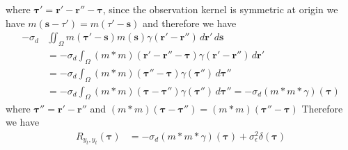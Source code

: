\documentclass[]{article}
\begin{document}
where  $\boldsymbol\tau'=\mathbf{r}'-\mathbf{r}''-\boldsymbol{\tau}$, since the observation kernel is symmetric at origin we have $m\left(\mathbf{s}-\tau'\right)=m\left(\tau'-\mathbf{s}\right)$ and therefore we have
\begin{align}
 -\sigma_d&\iint_{\Omega}{ m\left(\boldsymbol\tau'-\mathbf{s}\right) m\left(\mathbf{s}\right)\gamma(\mathbf{r}'-\mathbf{r}'') \, d\mathbf{r}'}{ \, d\mathbf{s}}\nonumber\\
&=-\sigma_d\int_{\Omega}{ \left(m\ast m\right)\left(\mathbf{r}'-\mathbf{r}''-\boldsymbol{\tau}\right)\gamma(\mathbf{r}'-\mathbf{r}'') \, d\mathbf{r}'}\nonumber\\
&=-\sigma_d\int_{\Omega}{ \left(m\ast m\right)\left(\boldsymbol\tau''-\boldsymbol{\tau}\right)\gamma(\boldsymbol\tau'') \, d\boldsymbol\tau''}\\
&=-\sigma_d\int_{\Omega}{ \left(m\ast m\right)\left(\boldsymbol{\tau}-\boldsymbol\tau''\right)\gamma(\boldsymbol\tau'') \, d\boldsymbol\tau''}=-\sigma_d\left(m \ast m \ast \gamma\right)\left(\boldsymbol{\tau}\right)
\end{align}
where $\boldsymbol\tau''=\mathbf{r}'-\mathbf{r}''$ and $\left(m\ast m\right)\left(\boldsymbol{\tau}-\boldsymbol\tau''\right)= \left(m\ast m\right)\left(\boldsymbol{\tau''}-\boldsymbol\tau\right)$
Therefore we have
\begin{align}
	R_{y_{t},y_{t}}(\boldsymbol{\tau}) &= -\sigma_d\left(m \ast m \ast \gamma\right)\left(\boldsymbol{\tau}\right)+\sigma_{\epsilon}^2\delta(\boldsymbol\tau)
\end{align}
\end{document}
